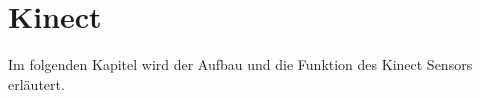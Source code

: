 \chapter{Kinect}      %
Im folgenden Kapitel wird der Aufbau und die Funktion des Kinect Sensors erläutert.



